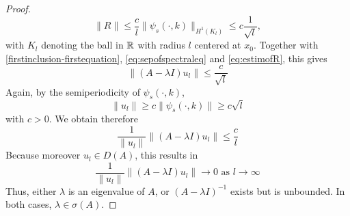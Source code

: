 \begin{theorem}
\begin{proof}
		\begin{equation}
			 \| R \| \leq \frac{c}{l} \| \psi_{s}(\cdot, k) \|_{H^{1}(K_{l})} \leq c \frac{1}{\sqrt{l}}, \label{eq:estimofR}
		\end{equation}
		with $K_{l}$ denoting the ball in $\mathbb{R}$ with radius $l$ centered at $x_{0}$. Together with \eqref{firstinclusion-firstequation}, \eqref{eq:sepofspectraleq} and \eqref{eq:estimofR}, this gives
		\[ \| (A - \lambda I) u_{l} \| \leq \frac{c}{\sqrt{l}} \]
		Again, by the semiperiodicity of $\psi_{s}(\cdot, k)$,
		\[ \| u_{l} \| \geq c \| \psi_{s}(\cdot, k) \| \geq c \sqrt{l} \]
		with $c > 0$. We obtain therefore
		\[ \frac{1}{\|u_{l}\|}\| (A - \lambda I) u_{l} \| \leq \frac{c}{l} \]
		Because moreover $u_{l} \in D(A)$, this results in
			\[ \frac{1}{\|u_{l} \|} \| (A - \lambda I) u_{l} \| \rightarrow 0 \text{ as } l \rightarrow \infty \]
		Thus, either $\lambda$ is an eigenvalue of $A$, or $(A - \lambda I)^{-1}$ exists but is unbounded. In both cases, $\lambda \in \sigma(A)$.
	\end{proof}
\end{theorem}	

